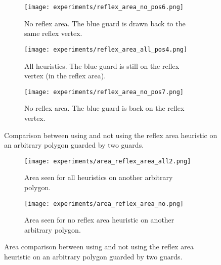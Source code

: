 \begin{figure}[h!]
\begin{adjustbox}{minipage=\textwidth,scale=0.9}
\begin{subfigure}{0.45\textwidth}
            \texttt{[image: experiments/reflex\_area\_no\_pos6.png]}
            \caption{No reflex area. The blue guard is drawn back to the same reflex vertex.}
            \label{fig:reflex_area_no3}
        \end{subfigure}
        \begin{subfigure}{0.45\textwidth}
            \texttt{[image: experiments/reflex\_area\_all\_pos4.png]}
            \caption{All heuristics. The blue guard is still on the reflex vertex (in the reflex area).}
        \end{subfigure}
        \hfill
        \begin{subfigure}{0.45\textwidth}
            \texttt{[image: experiments/reflex\_area\_no\_pos7.png]}
            \caption{No reflex area. The blue guard is back on the reflex vertex.}
            \label{fig:reflex_area_no4}
        \end{subfigure}
        \caption{Comparison between using and not using the reflex area heuristic on an arbitrary polygon guarded by two guards.}
        \label{fig:reflex_area_eg}
    \end{adjustbox}
    \end{figure}
\newpage



\begin{figure}[h!]
    \centering
    \begin{subfigure}{0.45\textwidth}
        \texttt{[image: experiments/area\_reflex\_area\_all2.png]}
        \caption{Area seen for all heuristics on another arbitrary polygon.}
        \label{fig:area_reflex_area_all}
    \end{subfigure}
    \hfill
    \begin{subfigure}{0.45\textwidth}
        \texttt{[image: experiments/area\_reflex\_area\_no.png]}
        \caption{Area seen for no reflex area heuristic on another arbitrary polygon.}
        \label{fig:area_reflex_area_no}
    \end{subfigure}
    \caption{Area comparison between using and not using the reflex area heuristic on an arbitrary polygon guarded by two guards.}
    \label{fig:area_reflex_area}
\end{figure}



